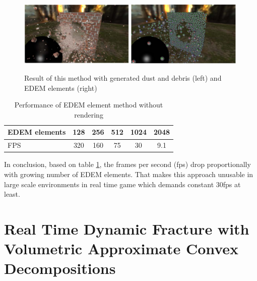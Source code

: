  \begin{figure}[ht!]
        \centering
        \includegraphics[width=0.49\textwidth]{img/edem_real}
        \includegraphics[width=0.49\textwidth]{img/edem}
        \caption{Result of this method with generated dust and debris (left) and EDEM elements (right) \cite{edem}}
        \label{edem}
    \end{figure}
   
\begin{table}[ht!]
    \begin{center}
  \begin{tabular}{ |l|c|c|c|c|c| } 
  \hline
  EDEM elements & 128 & 256 & 512 & 1024 & 2048 \\ 
  \hline
  FPS & 320 & 160 & 75 & 30 & 9.1 \\ 
  \hline
  
  \end{tabular}
  \end{center}
  \caption{Performance of EDEM element method without rendering \cite{edem}}
  \label{table1}
\end{table}
In conclusion, based on table \ref{table1}, the frames per second (fps) drop proportionally with growing number of EDEM elements. That makes this approach unusable in large scale environments in real time game which demands constant 30fps at least.

\section{Real Time Dynamic Fracture
with Volumetric Approximate Convex Decompositions}
\cite{nvidia}


















